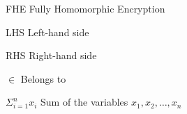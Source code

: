 \begin{siglas}
    \item[FHE] Fully Homomorphic Encryption
    \item[LHS] Left-hand side
    \item[RHS] Right-hand side  
  \end{siglas}
  
  \begin{simbolos}
    \item[$\in$] Belongs to 
    \item[$\Sigma_{i=1}^n x_i$] Sum of the variables $x_1, x_2, \dots, x_n$
  \end{simbolos}
